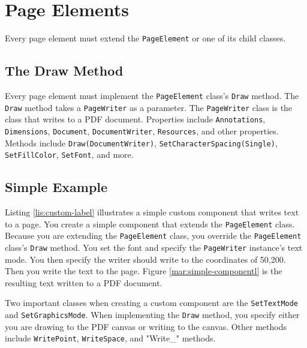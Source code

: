 \documentclass[american,letterpaper]{tufte-book}
\numberwithin{equation}{section}
\numberwithin{figure}{section}
\begin{document}
{{\section{Page Elements}
Every page element must extend the \texttt{PageElement} or one of its child classes.
\subsection{The Draw Method}
Every page element must implement the \texttt{PageElement} class's \texttt{Draw} method. The \texttt{Draw} method takes a \texttt{PageWriter} as a parameter. The \texttt{PageWriter} class is the class that writes to a PDF document. Properties include \texttt{Annotations}, \texttt{Dimensions}, \texttt{Document}, \texttt{DocumentWriter}, \texttt{Resources}, and other properties. 
Methods include \texttt{Draw(DocumentWriter)}, \texttt{SetCharacterSpacing(Single)}, \texttt{SetFillColor}, \texttt{SetFont}, and more.
\subsection{Simple Example}
Listing \ref{lis:custom-label} illustrates a simple custom component that writes text to a page. You create a simple component that extends the \texttt{PageElement} class. Because you are extending the \texttt{PageElement} class, you override the \texttt{PageElement} class's \texttt{Draw} method. You set the font and specify the \texttt{PageWriter} instance's text mode. You then specify the writer should write to the coordinates of 50,200. Then you write the text to the page.  Figure \ref{mar:simple-componentl} is the resulting text written to a PDF document.

Two important classes when creating a custom component are the \texttt{SetTextMode} and \texttt{SetGraphicsMode}. When implementing the \texttt{Draw} method, you specify either you are drawing to the PDF canvas or writing to the canvas. Other methods include \texttt{WritePoint}, \texttt{WriteSpace}, and "Write\_" methods.  

}}
\end{document}
